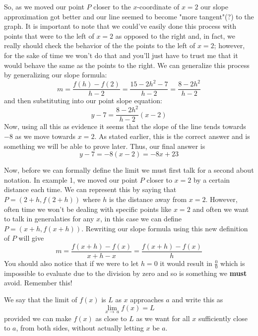 \documentclass[addpoints]{exam}
\begin{document}
\begin{questions}
\begin{minipage}{0.31\linewidth}
		\end{minipage}
		\vspace{0.1in}
		\newline
		So, as we moved our point $P$ closer to the $x$-coordinate of $x=2$ our slope approximation got better and our line seemed to become "more tangent"(?) to the graph. It is important to note that we could've easily done this process with points that were to the left of $x=2$ as opposed to the right and, in fact, we really should check the behavior of the the points to the left of $x=2$; however, for the sake of time we won't do that and you'll just have to trust me that it would behave the same as the points to the right. We can generalize this process by generalizing our slope formula:
		\[
			m = \frac{f(h)-f(2)}{h-2} = \frac{15-2h^2 - 7}{h-2} = \frac{8-2h^2}{h-2}
		\]
		and then substituting into our point slope equation:
		\[
			y-7=\frac{8-2h^2}{h-2}\left(x-2\right)
		\]
		Now, using all this as evidence it seems that the slope of the line tends towards $-8$ as we move towards $x=2$. As stated earlier, this is the correct answer and is something we will be able to prove later. Thus, our final answer is
		\[
			\boxed{y-7=-8(x-2)=-8x+23}
		\]
	\fi
\end{questions}
\newpage
\noindent Now, before we can formally define the limit we must first talk for a second about notation. In example 1, we moved our point $P$ closer to $x=2$ by a certain distance each time. We can represent this by saying that $P=(2+h, f(2+h))$ where $h$ is the distance away from $x=2$. However, often time we won't be dealing with specific points like $x=2$ and often we want to talk in generalaties for any $x$, in this case we can define $P=(x+h, f(x+h))$. Rewriting our slope formula using this new definition of $P$ will give
\[
	m = \frac{f(x+h)-f(x)}{x+h-x} = \frac{f(x+h)-f(x)}{h}
\]
You should also notice that if we were to let $h=0$ it would result in $\frac{0}{0}$ which is impossible to evaluate due to the division by zero and so is something we \textbf{must} avoid. Remember this!
\begin{tcolorbox}[breakable, title=DEFINITION OF THE LIMIT, colframe=black, sharp corners, colback=white, colbacktitle=white, coltitle=black]
	We say that the limit of $f(x)$ is $L$ as $x$ approaches $a$ and write this as
	\[\lim\limits_{x\to\,a} f(x)=L\]
	provided we can make $f(x)$ as close to $L$ as we want for all $x$ sufficiently close to $a$, from both sides, without actually letting $x$ be $a$.
\end{tcolorbox}
\end{document}
